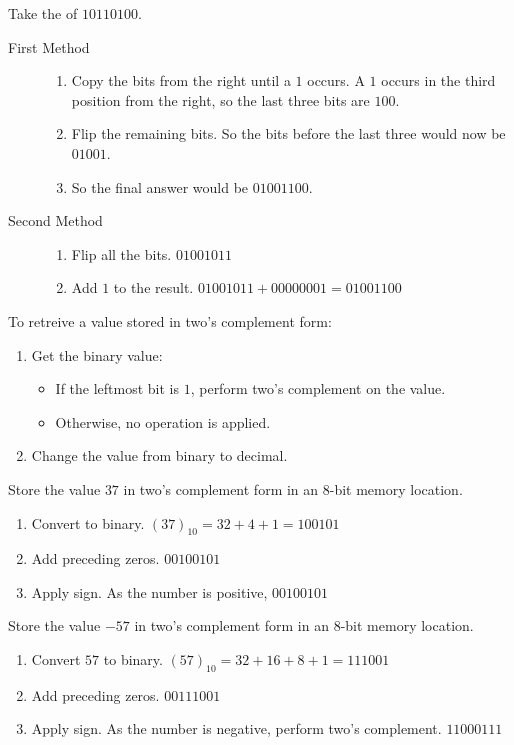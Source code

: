 \documentclass[\main/notes.tex]{subfiles}
\begin{document}
					\begin{example}
						Take the  of $10110100$.
						\begin{description}
							\item[First Method] 
								\begin{enumerate}
									\item Copy the bits from the right until a $1$ occurs. A $1$ occurs in the third position from the right, so the last three bits are $100$.
									\item Flip the remaining bits. So the bits before the last three would now be $01001$.
									\item So the final answer would be $01001100$.
								\end{enumerate}
							\item[Second Method]
								\begin{enumerate}
									\item Flip all the bits. $01001011$
									\item Add $1$ to the result. $01001011 + 00000001 = 01001100$
								\end{enumerate}
						\end{description}
					\end{example}
					To retreive a value stored in two's complement form:
					\begin{enumerate}
						\item Get the binary value:
							\begin{itemize}
								\item If the leftmost bit is $1$, perform two's complement on the value.
								\item Otherwise, no operation is applied.
							\end{itemize}
						\item Change the value from binary to decimal.
					\end{enumerate}
					\pagebreak
					\begin{example}
						Store the value $37$ in two's complement form in an $8$-bit memory location.
						\begin{enumerate}
							\item Convert to binary. $(37)_{10} = 32 + 4 + 1 = 100101$
							\item Add preceding zeros. $00100101$
							\item Apply sign. As the number is positive, $00100101$
						\end{enumerate}
					\end{example}
					\begin{example}
						Store the value $-57$ in two's complement form in an $8$-bit memory location.
						\begin{enumerate}
							\item Convert $57$ to binary. $(57)_{10} = 32 + 16 + 8 + 1 = 111001$
							\item Add preceding zeros. $00111001$
							\item Apply sign. As the number is negative, perform two's complement. $11000111$
						\end{enumerate}
					\end{example}
\end{document}
